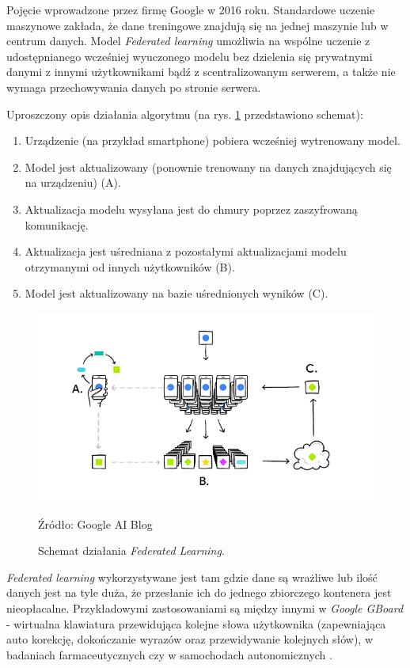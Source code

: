 Pojęcie wprowadzone przez firmę Google w 2016 roku. Standardowe uczenie maszynowe zakłada, że dane treningowe znajdują się na jednej maszynie lub w centrum danych. Model \textit{Federated learning} umożliwia na wspólne uczenie z udostępnianego wcześniej wyuczonego modelu bez dzielenia się prywatnymi danymi z innymi użytkownikami bądź z scentralizowanym serwerem, a także nie wymaga przechowywania danych po stronie serwera.

Uproszczony opis działania algorytmu (na rys. \ref{fig:fl} przedstawiono schemat):
\begin{enumerate}
    \item Urządzenie (na przykład smartphone) pobiera wcześniej wytrenowany model.
    \item Model jest aktualizowany (ponownie trenowany na danych znajdujących się na urządzeniu) (A).
    \item Aktualizacja modelu wysyłana jest do chmury poprzez zaszyfrowaną komunikację.
    \item Aktualizacja jest uśredniana z pozostałymi aktualizacjami modelu otrzymanymi od innych użytkowników (B).
    \item Model jest aktualizowany na bazie uśrednionych wyników (C).
\end{enumerate}

\begin{figure}
    \centering
    \includegraphics[scale=0.6]{images/fl.png}
    \caption{Schemat działania \textit{Federated Learning}.}    Źródło: Google AI Blog \cite{fedderatedLearning}
    \label{fig:fl}
\end{figure}

\textit{Federated learning} wykorzystywane jest tam gdzie dane są wrażliwe lub ilość danych jest na tyle duża, że przesłanie ich do jednego zbiorczego kontenera jest nieopłacalne. Przykładowymi zastosowaniami są między innymi w \textit{Google GBoard} \cite{fedderatedLearning} - wirtualna klawiatura przewidująca kolejne słowa użytkownika (zapewniająca auto korekcję, dokończanie wyrazów oraz przewidywanie kolejnych słów), w badaniach farmaceutycznych \cite{fedderatedLearningHealth} czy w samochodach autonomicznych \cite{fedderatedLearningVehicle}.

